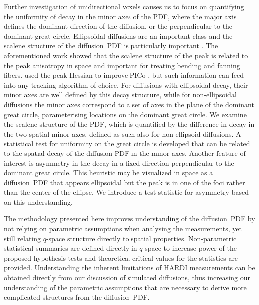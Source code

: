 \documentclass[dvips,aoas,preprint]{imsart}
\numberwithin{equation}{section}
\theoremstyle{plain}
\begin{document}
Further investigation of unidirectional voxels causes us to focus on
quantifying the uniformity of decay in the minor axes of the PDF,
where the major axis defines the dominant direction of the diffusion,
or the perpendicular to the dominant great circle.  Ellipsoidal
diffusions are an important class and the scalene structure of the
diffusion~PDF is particularly important \citep{Seunarine}.  The
aforementioned work showed that the scalene structure of the peak is
related to the peak anisotropy in space and important for treating
bending and fanning fibers.  \citet{Seunarine} used the peak Hessian to
improve PICo \citep{par-ale:pico}, but such information can feed into
any tracking algorithm of choice.  For diffusions with ellipsoidal
decay, their minor axes are well defined by this decay structure,
while for non-ellipsoidal diffusions the minor axes correspond to a
set of axes in the plane of the dominant great circle, parameterising
locations on the dominant great circle.  We examine the scalene
structure of the PDF, which is quantified by the difference in decay
in the two spatial minor axes, defined as such also for non-ellipsoid
diffusions.  
A statistical test for uniformity on the great circle is developed
that can be related to the spatial decay of the diffusion PDF in the
minor axes.  Another feature of interest is asymmetry in the decay in
a fixed direction perpendicular to the dominant great circle.  This
heuristic may be visualized in space as a diffusion~PDF that appears
ellipsoidal but the peak is in one of the foci rather than the center
of the ellipse.  We introduce a test statistic for asymmetry based on
this understanding.


The methodology presented here improves understanding of the
diffusion~PDF by not relying on parametric assumptions when analysing
the measurements, yet still relating $q$-space structure directly to
spatial properties.  Non-parametric statistical summaries are defined
directly in $q$-space to increase power of the proposed hypothesis
tests and theoretical critical values for the statistics are provided.
Understanding the inherent limitations of HARDI measurements can be
obtained directly from our discussion of simulated diffusions, thus
increasing our understanding of the parametric assumptions that are
necessary to derive more complicated structures from the
diffusion~PDF.
\end{document}

